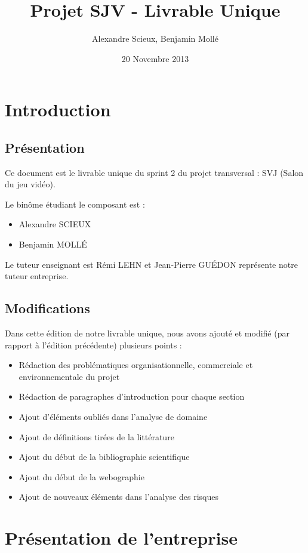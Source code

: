 \documentclass[french]{article}
\title{Projet SJV - Livrable Unique}
\author{Alexandre Scieux, Benjamin Mollé}
\date{20 Novembre 2013}
\begin{document}
\maketitle
\tableofcontents


\newpage
\section{Introduction}

\subsection*{Présentation}

Ce document est le livrable unique du sprint 2 du projet transversal : SVJ (Salon du jeu vidéo).

Le binôme étudiant le composant est :
\begin{itemize}
	\item Alexandre SCIEUX
	\item Benjamin MOLLÉ
\end{itemize}

Le tuteur enseignant est Rémi LEHN et Jean-Pierre GUÉDON représente notre tuteur entreprise.

\subsection*{Modifications}

Dans cette édition de notre livrable unique, nous avons ajouté et modifié (par rapport à l'édition précédente) plusieurs points :
\begin{itemize}
	\item Rédaction des problématiques organisationnelle, commerciale et environnementale du projet
    \item Rédaction de paragraphes d'introduction pour chaque section
    \item Ajout d'éléments oubliés dans l'analyse de domaine
    \item Ajout de définitions tirées de la littérature
    \item Ajout du début de la bibliographie scientifique
    \item Ajout du début de la webographie
	\item Ajout de nouveaux éléments dans l'analyse des risques    
\end{itemize}

\section{Présentation de l'entreprise}
\end{document}
